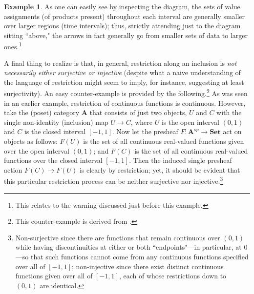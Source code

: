 \documentclass[a4paper]{book}
\theoremstyle{definition}
\newtheorem{example}{Example}[section]
\theoremstyle{definition}
\theoremstyle{definition}
\theoremstyle{theorem}
\theoremstyle{definition}
\begin{document}
\begin{example}
As one can easily see by inspecting the diagram, the sets of value assignments (of products present) throughout each interval are generally smaller over larger regions (time intervals); thus, strictly attending just to the diagram sitting ``above," the arrows in fact generally go from smaller sets of data to larger ones.\footnote{This relates to the warning discussed just before this example.} \par 
A final thing to realize is that, in general, restriction along an inclusion is \textit{not necessarily either surjective or injective} (despite what a naive understanding of the language of restriction might seem to imply, for instance, suggesting at least surjectivity). An easy counter-example is provided by the following.\footnote{This counter-example is derived from \cite{lawvere_sets_2003}.} As was seen in an earlier example, restriction of continuous functions is continuous. However, take the (poset) category $\textbf{A}$ that consists of just two objects, $U$ and $C$ with the single non-identity (inclusion) map $U \rightarrow C$, where $U$ is the open interval $(0,1)$ and $C$ is the closed interval $[-1,1]$. Now let the presheaf $F: \textbf{A}^{op} \rightarrow \textbf{Set}$ act on objects as follows: $F(U)$ is the set of all continuous real-valued functions given over the open interval $(0,1)$; and $F(C)$ is the set of all continuous real-valued functions over the closed interval $[-1,1]$. Then the induced single presheaf action $F(C) \rightarrow F(U)$ is clearly by restriction; yet, it should be evident that this particular restriction process can be neither surjective nor injective.\footnote{Non-surjective since there are functions that remain continuous over $(0,1)$ while having discontinuities at either or both ``endpoints"---in particular, at $0$---so that such functions cannot come from any continuous functions specified over all of $[-1,1]$; non-injective since there exist distinct continuous functions given over all of $[-1,1]$, each of whose restrictions down to $(0,1)$ are identical.}    
\end{example}  
\end{document}
